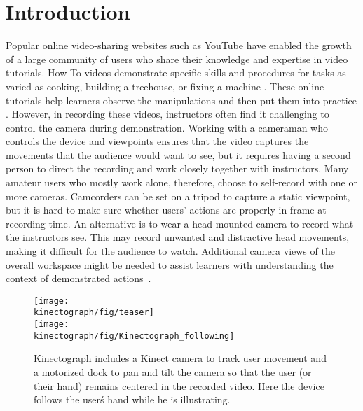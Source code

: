\section{Introduction}

Popular online video-sharing websites such as YouTube have enabled the growth of a large community of users who share their knowledge and expertise in video tutorials. How-To videos demonstrate specific skills and procedures for tasks as varied as cooking, building a treehouse, or fixing a machine \cite{Torrey:2007he}.
These online tutorials help learners observe the manipulations and then put them into practice \cite{Torrey:2009fc}. However, in recording these videos, instructors often find it challenging to control the camera during demonstration.
%
Working with a cameraman who controls the device and viewpoints ensures that the video captures the movements that the audience would want to see, but it requires having a second person to direct the recording and work closely together with instructors. Many amateur users who mostly work alone, therefore, choose to self-record with one or more cameras. Camcorders can be set on a tripod to capture a static viewpoint, but it is hard to make sure whether users' actions are properly in frame at recording time. An alternative is to wear a head mounted camera to record what the instructors see. This may record unwanted and distractive head movements, making it difficult for the audience to watch. Additional camera views of the overall workspace might be needed to assist learners with understanding the context of demonstrated actions~\cite{Fussell:2003te}.

\begin{figure}[t]
\centering
\texttt{[image: \\kinectograph/fig/teaser]}\\
\texttt{[image: \\kinectograph/fig/Kinectograph\_following]}
\caption{Kinectograph includes a Kinect camera to track user movement and a motorized dock to pan and tilt the camera so that the user (or their hand) remains centered in the recorded video. Here the device follows the user\'s hand while he is illustrating.}
\label{fig:figure1}
\end{figure}

